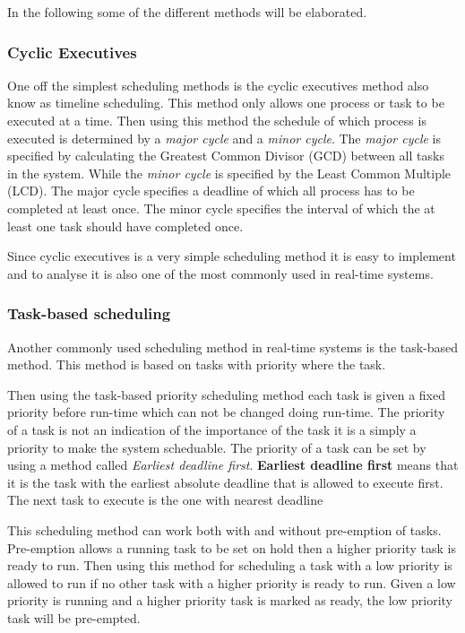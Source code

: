 In the following some of the different methods will be elaborated. 

\subsubsection{Cyclic Executives}
One off the simplest scheduling methods is the cyclic executives method also know as timeline scheduling.
This method only allows one process or task to be executed at a time. 
Then using this method the schedule of which process is executed is determined by a \textit{major cycle} and a \textit{minor cycle}.
The \textit{major cycle} is specified by calculating the Greatest Common Divisor (GCD) between all tasks in the system.
While the \textit{minor cycle} is specified by the Least Common Multiple (LCD). 
The major cycle specifies a deadline of which all process has to be completed at least once.
The minor cycle specifies the interval of which the at least one task should have completed once. 

Since cyclic executives is a very simple scheduling method it is easy to implement and to analyse it is also one of the most commonly used in real-time systems\cite{RealTimeEmbeddedSystems}. 

\subsubsection{Task-based scheduling}
Another commonly used scheduling method in real-time systems is the task-based method. 
This method is based on tasks with priority where the task.


Then using the task-based priority scheduling method each task is given a fixed priority before run-time which can not be changed doing run-time.
The priority of a task is not an indication of the importance of the task it is a simply a priority to make the system scheduable. 
The priority of a task can be set by using a method called \textit{Earliest deadline first}.
\textbf{Earliest deadline first} means that it is the task with the earliest absolute deadline that is allowed to execute first. 
The next task to execute is the one with nearest deadline

This scheduling method can work both with and without pre-emption of tasks. 
Pre-emption allows a running task to be set on hold then a higher priority task is ready to run. 
Then using this method for scheduling a task with a low priority is allowed to run if no other task with a higher priority is ready to run. 
Given a low priority is running and a higher priority task is marked as ready, the low priority task will be pre-empted. 